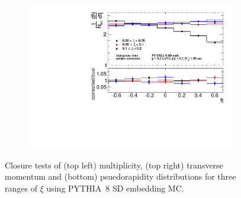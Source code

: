 \begin{figure}[h!]
\begin{subfigure}{.49\textwidth}
		\includegraphics[width=\textwidth,page=1]{chapters/chrgSTAR/img/closure/eta_test.pdf}
	\end{subfigure}
	\begin{minipage}{.49\textwidth}
		\caption{Closure tests of (top left) multiplicity, (top right) transverse momentum and (bottom) psuedorapidity distributions for three ranges of $\xi$ using PYTHIA~8 SD embedding MC.}
		\label{fig:closure_star}
	\end{minipage}
	
\end{figure}


 
